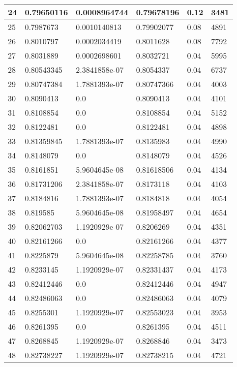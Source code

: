 \begin{longtable}{|l|l|l|l|l|l|}
24 & 0.79650116 & 0.0008964744 & 0.79678196 & 0.12 & 3481 \\ \hline 
25 & 0.7987673 & 0.0010140813 & 0.79902077 & 0.08 & 4891 \\ \hline 
26 & 0.8010797 & 0.0002034419 & 0.8011628 & 0.08 & 7792 \\ \hline 
27 & 0.8031889 & 0.0002698601 & 0.8032721 & 0.04 & 5995 \\ \hline 
28 & 0.80543345 & 2.3841858e-07 & 0.8054337 & 0.04 & 6737 \\ \hline 
29 & 0.80747384 & 1.7881393e-07 & 0.80747366 & 0.04 & 4003 \\ \hline 
30 & 0.8090413 & 0.0 & 0.8090413 & 0.04 & 4101 \\ \hline 
31 & 0.8108854 & 0.0 & 0.8108854 & 0.04 & 5152 \\ \hline 
32 & 0.8122481 & 0.0 & 0.8122481 & 0.04 & 4898 \\ \hline 
33 & 0.81359845 & 1.7881393e-07 & 0.8135983 & 0.04 & 4990 \\ \hline 
34 & 0.8148079 & 0.0 & 0.8148079 & 0.04 & 4526 \\ \hline 
35 & 0.8161851 & 5.9604645e-08 & 0.81618506 & 0.04 & 4134 \\ \hline 
36 & 0.81731206 & 2.3841858e-07 & 0.8173118 & 0.04 & 4103 \\ \hline 
37 & 0.8184816 & 1.7881393e-07 & 0.8184818 & 0.04 & 4054 \\ \hline 
38 & 0.819585 & 5.9604645e-08 & 0.81958497 & 0.04 & 4654 \\ \hline 
39 & 0.82062703 & 1.1920929e-07 & 0.8206269 & 0.04 & 4351 \\ \hline 
40 & 0.82161266 & 0.0 & 0.82161266 & 0.04 & 4377 \\ \hline 
41 & 0.8225879 & 5.9604645e-08 & 0.82258785 & 0.04 & 3760 \\ \hline 
42 & 0.8233145 & 1.1920929e-07 & 0.82331437 & 0.04 & 4173 \\ \hline 
43 & 0.82412446 & 0.0 & 0.82412446 & 0.04 & 4947 \\ \hline 
44 & 0.82486063 & 0.0 & 0.82486063 & 0.04 & 4079 \\ \hline 
45 & 0.8255301 & 1.1920929e-07 & 0.82553023 & 0.04 & 3953 \\ \hline 
46 & 0.8261395 & 0.0 & 0.8261395 & 0.04 & 4511 \\ \hline 
47 & 0.8268845 & 1.1920929e-07 & 0.8268846 & 0.04 & 3473 \\ \hline 
48 & 0.82738227 & 1.1920929e-07 & 0.82738215 & 0.04 & 4721 \\ \hline 

\end{longtable}
